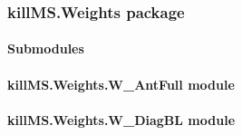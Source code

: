 \documentclass[letterpaper,10pt,english]{sphinxmanual}
\begin{document}
\sphinxstepscope


\subsubsection{killMS.Weights package}
\label{\detokenize{api/killMS.Weights:killms-weights-package}}\label{\detokenize{api/killMS.Weights::doc}}

\paragraph{Submodules}
\label{\detokenize{api/killMS.Weights:submodules}}

\paragraph{killMS.Weights.W\_AntFull module}
\label{\detokenize{api/killMS.Weights:killms-weights-w-antfull-module}}

\paragraph{killMS.Weights.W\_DiagBL module}
\label{\detokenize{api/killMS.Weights:module-killMS.Weights.W_DiagBL}}\label{\detokenize{api/killMS.Weights:killms-weights-w-diagbl-module}}
\end{document}
